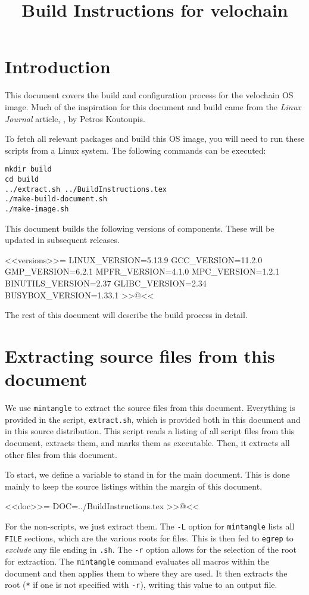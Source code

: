 \title{Build Instructions for velochain}

\section{Introduction}

This document covers the build and configuration process for the velochain OS
image. Much of the inspiration for this document and build came from the
\emph{Linux Journal} article,
, by Petros
Koutoupis.

To fetch all relevant packages and build this OS image, you will need to run
these scripts from a Linux system.  The following commands can be executed:

\begin{lstlisting}
mkdir build
cd build
../extract.sh ../BuildInstructions.tex
./make-build-document.sh
./make-image.sh
\end{lstlisting}

This document builds the following versions of components. These will be updated
in subsequent releases.

<<versions>>=
LINUX_VERSION=5.13.9
GCC_VERSION=11.2.0
GMP_VERSION=6.2.1
MPFR_VERSION=4.1.0
MPC_VERSION=1.2.1
BINUTILS_VERSION=2.37
GLIBC_VERSION=2.34
BUSYBOX_VERSION=1.33.1
>>@<<

The rest of this document will describe the build process in detail.

\section{Extracting source files from this document}

We use \verb/mintangle/ to extract the source files from this document.
Everything is provided in the script, \verb/extract.sh/, which is provided both
in this document and in this source distribution.  This script reads a listing
of all script files from this document, extracts them, and marks them as
executable.  Then, it extracts all other files from this document.

To start, we define a variable to stand in for the main document.  This is done
mainly to keep the source listings within the margin of this document.

<<doc>>=
DOC=../BuildInstructions.tex
>>@<<

For the non-scripts, we just extract them.  The \verb/-L/ option for
\verb/mintangle/ lists all \verb/FILE/ sections, which are the various roots for
files.  This is then fed to \verb/egrep/ to \emph{exclude} any file ending in
\verb/.sh/.  The \verb/-r/ option allows for the selection of the root for
extraction.  The \verb/mintangle/ command evaluates all macros within the
document and then applies them to where they are used.  It then extracts the
root (\verb/*/ if one is not specified with \verb/-r/), writing this value to
an output file.

